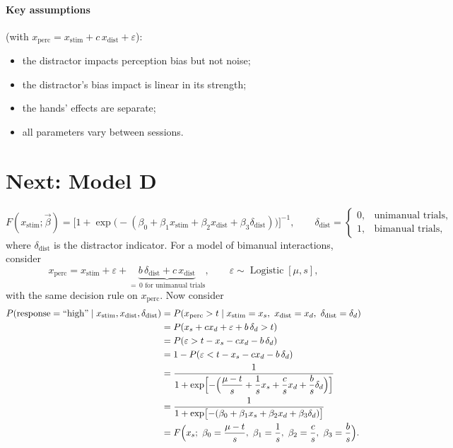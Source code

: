 \documentclass[11pt]{article}
\newcommand{\xs}{x_{\text{stim}}}
\newcommand{\xd}{x_{\text{dist}}}
\newcommand{\xp}{x_{\text{perc}}}
\newcommand{\dd}{\delta_{\text{dist}}}
\newcommand{\high}{\text{``high''}}
\newcommand{\bvec}{\vec{\beta}}
\begin{document}
\paragraph{Key assumptions} (with $\xp = \xs + c\,\xd + \varepsilon$):
\begin{itemize}[nosep]
  \item the distractor impacts perception bias but not noise;
  \item the distractor's bias impact is linear in its strength;
  \item the hands' effects are separate;
  \item all parameters vary between sessions.
\end{itemize}

\section{Next: Model D}

\[
  F(\xs; \bvec) = \bigl[1+\exp\bigl(-(\beta_0+\beta_1\xs+\beta_2\xd+\beta_3\dd)\bigr)\bigr]^{-1},
  \qquad
  \dd =
  \begin{cases}
    0, & \text{unimanual trials},\\
    1, & \text{bimanual trials},
  \end{cases}
\]
where $\dd$ is the distractor indicator. For a model of bimanual interactions, consider
\[
  \xp = \xs + \varepsilon + \underbrace{b\,\dd + c\,\xd}_{=\,0 \text{ for unimanual trials}},
  \qquad \varepsilon \sim \operatorname{Logistic}[\mu,s],
\]
with the same decision rule on $\xp$. Now consider
\begin{align*}
  P(\text{response} = \high \mid \xs, \xd, \dd)
  &= P(\xp > t \mid \xs = x_s,\ \xd = x_d,\ \dd = \delta_d)\\
  &= P(x_s + c x_d + \varepsilon + b\,\delta_d > t)\\
  &= P(\varepsilon > t - x_s - c x_d - b\,\delta_d)\\
  &= 1 - P(\varepsilon < t - x_s - c x_d - b\,\delta_d)\\
  &= \frac{1}{1+\exp\Bigl[-\Bigl(\dfrac{\mu-t}{s}+\dfrac{1}{s}x_s+\dfrac{c}{s}x_d+\dfrac{b}{s}\delta_d\Bigr)\Bigr]}\\
  &= \frac{1}{1+\exp\bigl[-(\beta_0+\beta_1 x_s+\beta_2 x_d+\beta_3\delta_d)\bigr]}\\
  &= F\Bigl(x_s;\ \beta_0 = \frac{\mu-t}{s},\ \beta_1 = \frac{1}{s},\ \beta_2 = \frac{c}{s},\ \beta_3 = \frac{b}{s}\Bigr).
\end{align*}
\end{document}
